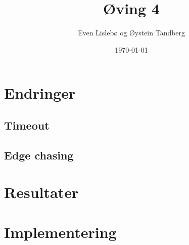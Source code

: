 \documentclass{article}
\begin{document}
\title{Øving 4}
\author{Even Lislebø og Øystein Tandberg}
\date{\today}
\maketitle

\section*{Endringer}
\subsection*{Timeout}

\subsection*{Edge chasing}

\section*{Resultater}

\section*{Implementering}
\end{document}
